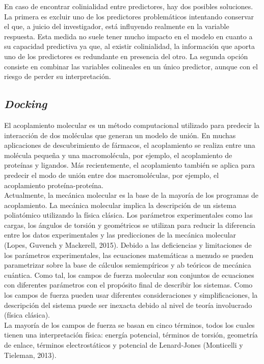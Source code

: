 {\noindent En caso de encontrar colinialidad entre predictores, hay dos posibles soluciones. La primera es excluir uno de los predictores problemáticos intentando conservar el que, a juicio del investigador, está influyendo realmente en la variable respuesta. Esta medida no suele tener mucho impacto en el modelo en cuanto a su capacidad predictiva ya que, al existir colinialidad, la información que aporta uno de los predictores es redundante en presencia del otro. La segunda opción consiste en combinar las variables colineales en un único predictor, aunque con el riesgo de perder su interpretación.


\subsection{\textit{Docking}}{
\noindent El acoplamiento molecular es un método computacional utilizado para predecir la interacción de dos moléculas que generan un modelo de unión. En muchas aplicaciones de descubrimiento de fármacos, el acoplamiento se realiza entre una molécula pequeña y una macromolécula, por ejemplo, el acoplamiento de proteínas y ligandos. Más recientemente, el acoplamiento también se aplica para predecir el modo de unión entre dos macromoléculas, por ejemplo, el acoplamiento proteína-proteína.\\

\noindent Actualmente, la mecánica molecular es la base de la mayoría de los programas de acoplamiento. La mecánica molecular implica la descripción de un sistema poliatómico utilizando la física clásica. Los parámetros experimentales como las cargas, los ángulos de torsión y geométricos se utilizan para reducir la diferencia entre los datos experimentales y las predicciones de la mecánica molecular (Lopes, Guvench y Mackerell, 2015). Debido a las deficiencias y limitaciones de los parámetros experimentales, las ecuaciones matemáticas a menudo se pueden parametrizar sobre la base de cálculos semiempíricos y ab teóricos de mecánica cuántica. Como tal, los campos de fuerza molecular son conjuntos de ecuaciones con diferentes parámetros con el propósito final de describir los sistemas. Como los campos de fuerza pueden usar diferentes consideraciones y simplificaciones, la descripción del sistema puede ser inexacta debido al nivel de teoría involucrado (física clásica).\\

\noindent La mayoría de los campos de fuerza se basan en cinco términos, todos los cuales tienen una interpretación física: energía potencial, términos de torsión, geometría de enlace, términos electrostáticos y potencial de Lenard-Jones (Monticelli y Tieleman, 2013).\\

}}

